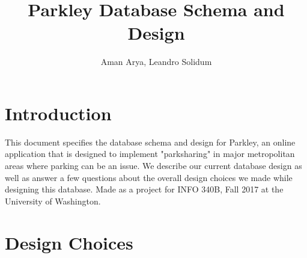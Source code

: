 \documentclass[a4paper]{article}
\title{Parkley Database Schema and Design}
\author{Aman Arya, Leandro Solidum}
\begin{document}
\maketitle

\section{Introduction}

This document specifies the database schema and design for Parkley, an online application that is designed to implement "parksharing" in major metropolitan areas where parking can be an issue. We describe our current database design as well as answer a few questions about the overall design choices we made while designing this database. Made as a project for INFO 340B, Fall 2017 at the University of Washington.

\section{Design Choices}
\end{document}
